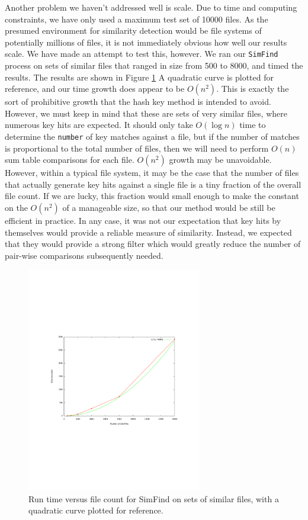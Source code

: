 \documentclass[10pt, twocolumn]{article}
\begin{document}
Another problem we haven't addressed well is scale.  Due to time and computing constraints, we have only used a maximum test set of 10000 files.  As the presumed environment for similarity detection would be file systems of potentially millions of files, it is not immediately obvious how well our results scale.  We have made an attempt to test this, however.  We ran our {\tt SimFind} process on sets of similar files that ranged in size from 500 to 8000, and timed the results.  The results are shown in Figure \ref{performanceTest}  A quadratic curve is plotted for reference, and our time growth does appear to be $O(n^2)$.  This is exactly the sort of prohibitive growth that the hash key method is intended to avoid.  However, we must keep in mind that these are sets of very similar files, where numerous key hits are expected.  It should only take $O(\log n)$ time to determine the {\tt number} of key matches against a file, but if the number of matches is proportional to the total number of files, then we will need to perform $O(n)$ sum table comparisons for each file.  $O(n^2)$ growth may be unavoidable.  However, within a typical file system, it may be the case that the number of files that actually generate key hits against a single file is a tiny fraction of the overall file count.  If we are lucky, this fraction would small enough to make the constant on the $O(n^2)$ of a manageable size, so that our method would be still be efficient in practice.  In any case, it was not our expectation that key hits by themselves would provide a reliable measure of similarity.  Instead, we expected that they would provide a strong filter which would greatly reduce the number of pair-wise comparisons subsequently needed.

 \begin{figure}[t] 
 \centering
\includegraphics[width= 3in]{performance.pdf}
\caption{Run time versus file count for SimFind on sets of similar files, with a quadratic curve plotted for reference.}
\label{performanceTest}
\end{figure}
\end{document}
